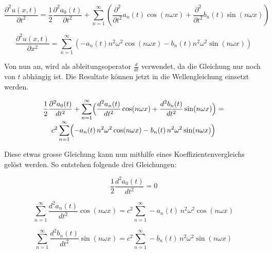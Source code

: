 \begin{equation}
	\frac{\partial^2 u(x,t)}{\partial t^2} = \frac{1}{2} \frac{\partial^2 a_0(t)}{\partial t^2} +  \sum_{n=1}^{\infty} \left( \frac{\partial^2}{\partial t^2} a_n(t) \cos(n \omega x) + \frac{\partial^2}{\partial t^2} b_n(t) \sin(n \omega x) \right)
\end{equation}

\begin{equation}
	\frac{\partial^2 u(x,t)}{\partial x^2} = \sum_{n=1}^{\infty} \left( -a_n(t) n^2 \omega^2 \cos(n \omega x) - b_n(t) n^2 \omega^2 \sin(n \omega x) \right)
\end{equation}


Von nun an, wird als ableitungsoperator $\frac{d}{dt}$ verwendet, da die Gleichung nur noch von $t$ abhängig ist.
Die Resultate können jetzt in die Wellengleichung einsetzt werden. 



\begin{multline}
	\frac{1}{2}\frac{\partial^2 a_0(t)}{dt^2}
	+ \sum_{n=1}^{\infty}\Bigl(
	\frac{d^2 a_n(t)}{dt^2}\cos(n\omega x)
	+ \frac{d^2 b_n(t)}{dt^2}\sin(n\omega x)
	\Bigr)
	= \\[-0.8ex]
	c^2 \sum_{n=1}^{\infty}\Bigl(
	-a_n(t)\,n^2\omega^2\cos(n\omega x)
	-b_n(t)\,n^2\omega^2\sin(n\omega x)
	\Bigr)
\end{multline}


Diese etwas grosse Gleichung kann nun mithilfe eines Koeffizientenvergleichs gelöst werden.
So entstehen folgende drei Gleichungen:

\begin{equation}
	\frac{1}{2} \frac{d^2 a_0(t)}{d t^2} = 0
\end{equation}

\begin{equation}
	\sum_{n=1}^{\infty}
	\frac{d^2 a_n(t)}{dt^2}\cos(n\omega x)
	 = c^2 \sum_{n=1}^{\infty}
	-a_n(t)\,n^2\omega^2\cos(n\omega x)
	\end{equation}

\begin{equation}
	\sum_{n=1}^{\infty}
	\frac{d^2 b_n(t)}{dt^2}\sin(n\omega x) = c^2 \sum_{n=1}^{\infty}
	-b_n(t)\,n^2\omega^2\sin(n\omega x)
\end{equation}


